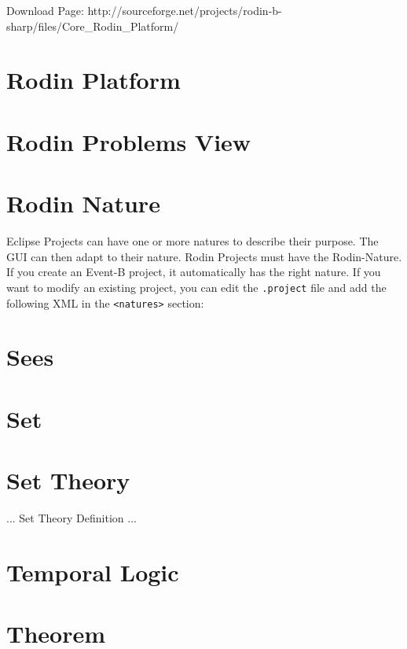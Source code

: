 Download Page: http://sourceforge.net/projects/rodin-b-sharp/files/Core\_Rodin\_Platform/


\section{Rodin Platform}
\label{rodin_platform}



\section{Rodin Problems View}
\label{rodin_problems_view}


\section{Rodin Nature}
\label{rodin_nature}

Eclipse Projects can have one or more natures to describe their purpose.  The GUI can then adapt to their nature.  Rodin Projects must have the Rodin-Nature.  If you create an Event-B project, it automatically has the right nature.  If you want to modify an existing project, you can edit the \texttt{.project} file and add the following XML in the \texttt{<natures>} section:


\section{Sees}
\label{sees}

\section{Set}
\label{set}

\section{Set Theory}
\label{set_theory}

... Set Theory Definition ...

\section{Temporal Logic}
\label{temporal_logic}

\section{Theorem}
\label{theorem}

